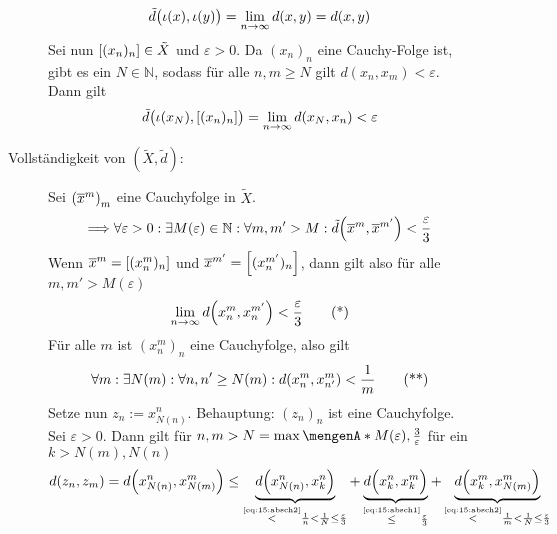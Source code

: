\begin{description}
\begin{description}
	\[
		\tilde{d} \enbrace[\big]{\iota(x),\iota(y)} = \lim_{ n \to \infty} d(x,y) = d(x,y)
	\]
	Sei nun $\benbrace*{(x_n)_n} \in \tilde{X}$ und $\varepsilon>0$. Da $(x_n)_n$ eine Cauchy-Folge ist, gibt es ein $N \in \mathds{N}$, sodass für alle
	$n,m \ge N$ gilt $d(x_n,x_m) <\varepsilon$. Dann gilt
	\[
		\tilde{d}\enbrace[\big]{\iota(x_N), \benbrace*{(x_n)_n} } = \lim_{ n \to \infty} d \enbrace*{x_N, x_n} < \varepsilon
	\]
	\item[Vollständigkeit von $(\tilde{X}, \tilde{d})$:] Sei $\enbrace*{\overline{x}^m}_m$ eine Cauchyfolge in $\tilde{X}$.
	\[
		\Longrightarrow \forall \varepsilon >0 : \exists M(\varepsilon) \in \mathds{N} : \forall m,m' > M : \tilde{d} \enbrace*{\overline{x}^m, \overline{x}^{m'}} < \frac{\varepsilon}{3} 
	\]
	Wenn $\overline{x}^m = \benbrace*{(x^m_n)_n}$ und $\overline{x}^{m'} = \benbrace*{(x^{m'}_n)_n} $, dann gilt also für alle $m,m' >M(\varepsilon)$
	\begin{equation*}
		\lim_{ n \to \infty} d \enbrace*{x^m_n, x^{m'}_n} < \frac{\varepsilon}{3}  \label{eq:15:absch1}\tag{*}
	\end{equation*}
	Für alle $m$ ist $(x^m_n)_n$ eine Cauchyfolge, also gilt
	\begin{equation*}
		\forall m : \exists N(m) : \forall n,n' \ge N(m) : d \enbrace*{x^m_n, x^m_{n'}} < \frac{1}{m}  \label{eq:15:absch2}\tag{**}
	\end{equation*}
	Setze nun $z_n := x^n_{N(n)}$. Behauptung: $(z_n)_n$ ist eine Cauchyfolge. Sei $\varepsilon>0$. Dann gilt für $n,m>N=\max\set{M(\varepsilon), \frac{3}{\varepsilon}}$
	für ein $k > N(m), N(n)$ 
	\begin{align*}
		d(z_n,z_m) = d \enbrace*{x^n_{N(n)}, x^m_{N(m)}} \le 
		\underbrace{d\enbrace*{x^n_{N(n)}, x^n_k}}_{\stackrel{\text{\eqref{eq:15:absch2}}}{<} \frac{1}{n} < \frac{1}{N} \le \frac{\varepsilon}{3}} + 
		\underbrace{d\enbrace[\Big]{x^n_k, x^m_k}}_{\stackrel{\text{\eqref{eq:15:absch1}}}{\le} \frac{\varepsilon}{3}}   + 
		\underbrace{d\enbrace*{x^m_k, x^m_{N(m)}}}_{\stackrel{\text{\eqref{eq:15:absch2}}}{<} \frac{1}{m} < \frac{1}{N} \le \frac{\varepsilon}{3}} 

\end{align*}
\end{description}
\end{description}

